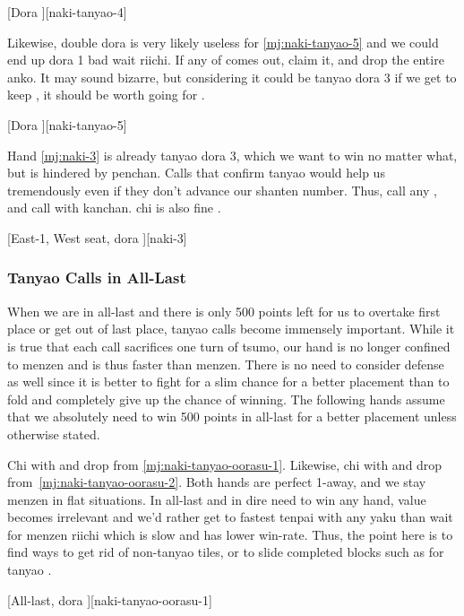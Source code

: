 \documentclass[12pt]{article}
\begin{document}
[Dora ][naki-tanyao-4]

Likewise, double dora  is very likely useless for \ref{mj:naki-tanyao-5} and we could end up dora 1 bad wait riichi. If any of  comes out, claim it, and drop the entire  anko. It may sound bizarre, but considering it could be tanyao dora 3 if we get to keep , it should be worth going for \citep{nemata-133}.

[Dora ][naki-tanyao-5]

Hand \ref{mj:naki-3} is already tanyao dora 3, which we want to win no matter what, but is hindered by  penchan. Calls that confirm tanyao would help us tremendously even if they don't advance our shanten number. Thus, call any , and call  with  kanchan.  chi is also fine \citep[][p.~61]{hirasawa-naki}.

[East-1, West seat, dora ][naki-3]


\subsubsection*{Tanyao Calls in All-Last}

When we are in all-last and there is only 500 points left for us to overtake first place or get out of last place, tanyao calls become immensely important. While it is true that each call sacrifices one turn of tsumo, our hand is no longer confined to menzen and is thus faster than menzen. There is no need to consider defense as well since it is better to fight for a slim chance for a better placement than to fold and completely give up the chance of winning. The following hands assume that we absolutely need to win 500 points in all-last for a better placement unless otherwise stated.

Chi  with  and drop  from \ref{mj:naki-tanyao-oorasu-1}. Likewise, chi  with  and drop  from~\ref{mj:naki-tanyao-oorasu-2}. Both hands are perfect 1-away, and we stay menzen in flat situations. In all-last and in dire need to win any hand, value becomes irrelevant and we'd rather get to fastest tenpai with any yaku than wait for menzen riichi which is slow and has lower win-rate. Thus, the point here is to find ways to get rid of non-tanyao tiles, or to slide completed blocks such as  for tanyao \citep{mark2-tanyao-naki}.

[All-last, dora ][naki-tanyao-oorasu-1]
\end{document}
